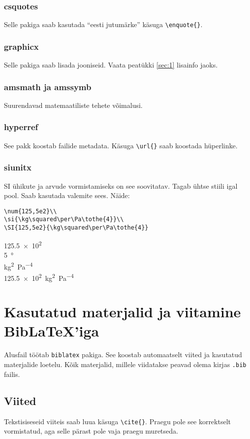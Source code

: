 \documentclass{trkut}%
\begin{document}
\subsection{\textsf{csquotes}}
Selle pakiga saab kasutada \enquote{eesti jutumärke} käsuga \verb!\enquote{}!.
\subsection{\textsf{graphicx}}
Selle pakiga saab lisada jooniseid. Vaata peatükki \ref{sec:1} lisainfo jaoks.
\subsection{\textsf{amsmath} ja \textsf{amssymb}}
Suurendavad matemaatiliste tehete võimalusi.
\subsection{\textsf{hyperref}}
See pakk koostab  failide metadata. Käsuga \verb!\url{}! saab koostada hüperlinke.
\subsection{\textsf{siunitx}}
SI ühikute ja arvude vormistamiseks on see soovitatav. Tagab ühtse stiili igal pool. Saab kasutada valemite sees. Näide:
\begin{verbatim}
\num{125,5e2}\\
\si{\kg\squared\per\Pa\tothe{4}}\\
\SI{125,5e2}{\kg\squared\per\Pa\tothe{4}}
\end{verbatim}
\num{125,5e2}\\
\SI{5}{\degree}\\
\si{\kg\squared\per\Pa\tothe{4}}\\
\SI{125,5e2}{\kg\squared\per\Pa\tothe{4}}


\chapter{Kasutatud materjalid ja viitamine BibLaTeX'iga}
Alusfail töötab \verb!biblatex! pakiga. See koostab automaatselt viited ja kasutatud materjalide loetelu. Kõik materjalid, millele viidatakse peavad olema kirjas \verb!.bib! failis.

\section{Viited}
Tekstisiseseid viiteis saab luua käsuga \verb!\cite{}!. Praegu pole see korrektselt vormistatud, aga selle pärast pole vaja praegu muretseda. \cite{palma15}
\end{document}
